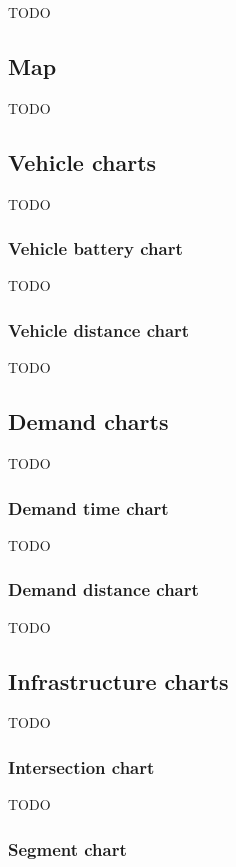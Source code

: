 \documentclass[10pt,twocolumn]{article}
\begin{document}
TODO

\subsection{Map}

TODO

\subsection{Vehicle charts}

TODO

\subsubsection{Vehicle battery chart}

TODO

\subsubsection{Vehicle distance chart}

TODO

\subsection{Demand charts}

TODO

\subsubsection{Demand time chart}

TODO

\subsubsection{Demand distance chart}

TODO

\subsection{Infrastructure charts}

TODO

\subsubsection{Intersection chart}

TODO

\subsubsection{Segment chart}
\end{document}
